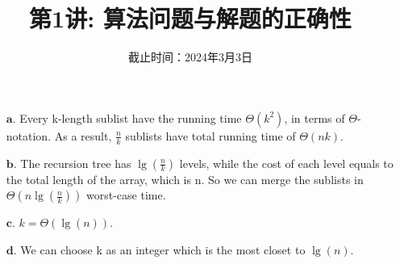\documentclass[a4paper, justified]{tufte-handout}
\title{第1讲: 算法问题与解题的正确性}
\date{截止时间：2024年3月3日} %
\begin{document}
\maketitle
\noplagiarism %

\beginrequired

\begin{problem}[TC Problem $2-1$]
\end{problem}

\begin{solution}
\begin{enumerate}
    \item [$\bm{a.}$] Every k-length sublist have the running time $\Theta(k^{2})$, in terms of $\Theta$-notation. As a result, $\frac{n}{k}$ sublists have total running time of $\Theta(nk)$.
    \item [$\bm{b.}$]  The recursion tree has $\lg (\frac{n}{k})$ levels, while the cost of each level equals to the total length of the array, which is n. So we can merge the sublists in $\Theta(n\lg(\frac{n}{k}))$ worst-case time.
    \item [$\bm{c.}$]  $k = \Theta(\lg(n))$.
    \item [$\bm{d.}$]  We can choose k as an integer which is the most closet to $\lg(n)$.
\end{enumerate}
\end{solution}

\begin{problem}[TC Problem $2-2$]
\end{problem}
\end{document}
